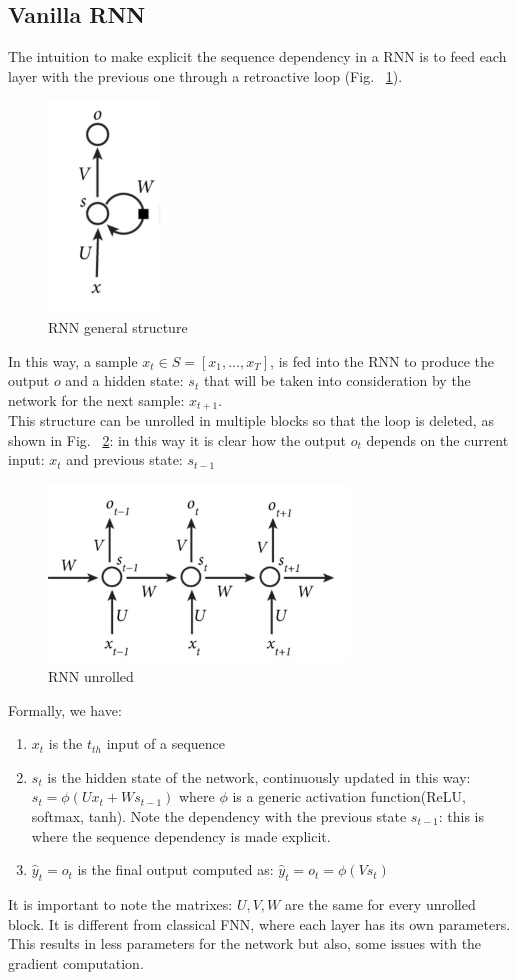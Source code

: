 \documentclass[LaM,binding=0.6cm]{sapthesis}
\begin{document}
\subsection{Vanilla RNN}
The intuition to make explicit the sequence dependency in a RNN is to feed each layer with the previous one through a retroactive loop (Fig. ~\ref{fig:rnnmod}).
\begin{figure}[H]  \centering
	\includegraphics[width=30mm,scale=0.3]{rnnmod}
	\caption{RNN general structure \cite{recsite}}
	\label{fig:rnnmod}
\end{figure}
In this way, a sample $x_t \in S=[x_1,\dots,x_T]$, is fed into the RNN to produce the output $o$ and a hidden state: $s_t$ that will be taken into consideration by the network for the next sample: $x_{t+1}$.\\This structure can be unrolled in multiple blocks so that the loop is deleted, as shown in Fig. ~\ref{fig:unrolled}: in this way it is clear how the output $o_t$ depends on the current input: $x_t$ and previous state: $s_{t-1}$
\begin{figure}[H]  \centering
	\includegraphics[width=80mm,scale=0.7]{unrolled}
	\caption{RNN unrolled \cite{recsite}}
	\label{fig:unrolled}
\end{figure}
Formally, we have:
\begin{enumerate}
\item $x_t$ is the $t_{th}$ input of a sequence
\item $s_t$ is the hidden state of the network, continuously updated in this way: $s_t = \phi(Ux_t + Ws_{t-1})$ where $\phi$ is a generic activation function(ReLU, softmax, tanh). Note the dependency with the previous state $s_{t-1}$: this is where the sequence dependency is made explicit.
\item $\hat{y}_t=o_t$ is the final output computed as: $\hat{y}_t=o_t=\phi(Vs_t)$
\end{enumerate}
It is important to note the matrixes: $U,V,W$ are the same for every unrolled block. It is different from classical FNN, where each layer has its own  parameters. This results in less parameters for the network but also, some issues with the gradient computation.
\end{document}
